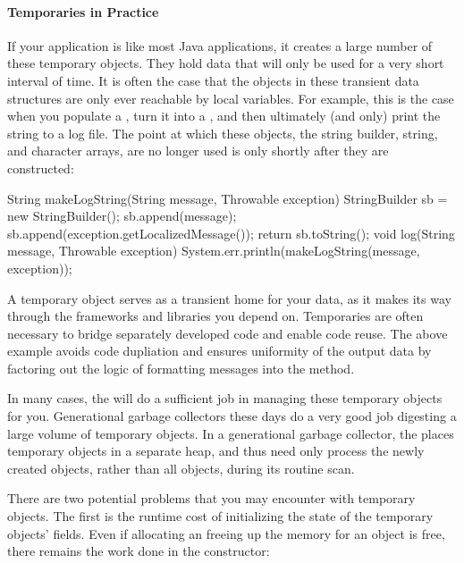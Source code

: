 \paragraph{Temporaries in Practice}
If your application is like most Java applications, it creates a large number of
these temporary objects. They hold data that will only be used for a very short
interval of time. It is often the case that the objects in these transient data
structures are only ever reachable by local variables. For example, this is the
case when you populate a , turn it into a ,
and then ultimately (and only) print the string to a log file. The point at
which these objects, the string builder, string, and character arrays, are no
longer used is only shortly after they are constructed:

\begin{shortlisting}
String makeLogString(String message, Throwable exception) {
	StringBuilder sb = new StringBuilder();
	sb.append(message);
	sb.append(exception.getLocalizedMessage());
	return sb.toString();
}
void log(String message, Throwable exception) {
	System.err.println(makeLogString(message, exception));
}
\end{shortlisting}

A temporary object serves as a transient home for your data, as it makes its way
through the frameworks and libraries you depend on. Temporaries are often
necessary to bridge separately developed code and enable code reuse. The above
example avoids code dupliation and ensures uniformity of the output data by
factoring out the logic of formatting messages into the 
method.


In many cases, the \jre will do a sufficient job in managing these temporary
objects for you. Generational garbage collectors  these days do a very good job digesting a large volume of temporary
objects. In a generational garbage collector, the \jre places temporary objects
in a separate heap, and thus need only process the newly created objects, rather
than all objects, during its routine scan.

There are two potential problems that you may encounter with temporary objects.
The first is the runtime cost of initializing the state of the temporary
objects' fields. Even if allocating an freeing up the memory for an object is
free, there remains the work done in the constructor:

